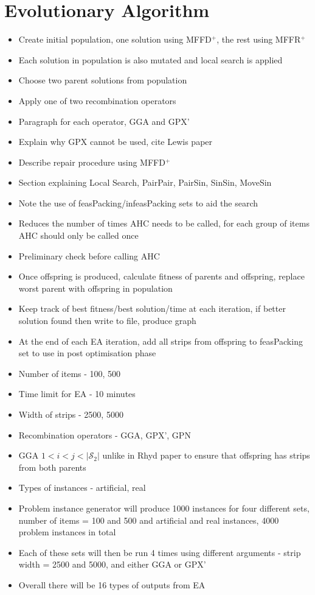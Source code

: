 \documentclass{elsarticle}
\begin{document}
\section{Evolutionary Algorithm}
\begin{itemize}
	\item Create initial population, one solution using MFFD$^+$, the rest using MFFR$^+$
	\item Each solution in population is also mutated and local search is applied
	\item Choose two parent solutions from population
	\item Apply one of two recombination operators
	\item Paragraph for each operator, GGA and GPX'
	\item Explain why GPX cannot be used, cite Lewis paper
	\item Describe repair procedure using MFFD$^+$
	\item Section explaining Local Search, PairPair, PairSin, SinSin, MoveSin
	\item Note the use of feasPacking/infeasPacking sets to aid the search
	\item Reduces the number of times AHC needs to be called, for each group of items AHC should only be called once
	\item Preliminary check before calling AHC
	\item Once offspring is produced, calculate fitness of parents and offspring, replace worst parent with offspring in population
	\item Keep track of best fitness/best solution/time at each iteration, if better solution found then write to file, produce graph
	\item At the end of each EA iteration, add all strips from offspring to feasPacking set to use in post optimisation phase
	\item Number of items - 100, 500
	\item Time limit for EA - 10 minutes
	\item Width of strips - 2500, 5000
	\item Recombination operators - GGA, GPX', GPN
	\item GGA $1 < i < j < |\mathcal{S}_2|$ unlike in Rhyd paper to ensure that offspring has strips from both parents
	\item Types of instances - artificial, real
	
	\item Problem instance generator will produce 1000 instances for four different sets, number of items = 100 and 500 and artificial and real instances, 4000 problem instances in total
	\item Each of these sets will then be run 4 times using different arguments - strip width = 2500 and 5000, and either GGA or GPX'
	\item Overall there will be 16 types of outputs from EA
	

\end{itemize}
\end{document}
